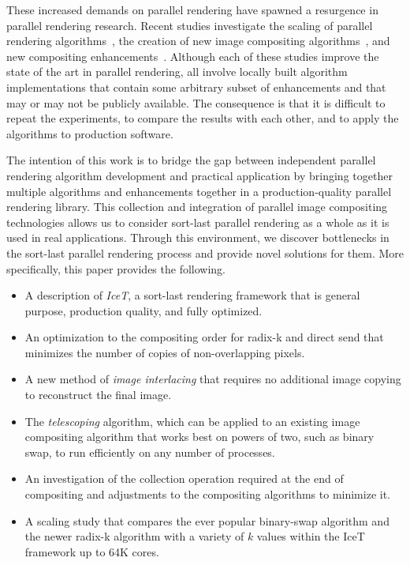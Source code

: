 \documentclass{acm_proc_article-sp}
\newcommand*{\lcite}[1]{~\cite{#1}}
\newcommand*{\keyterm}[1]{\emph{#1}}
\begin{document}
These increased demands on parallel rendering have spawned a resurgence in
parallel rendering research.  Recent studies investigate the scaling of
parallel rendering algorithms\lcite{Peterka2009}, the creation of new image
compositing algorithms\lcite{23Swap,RadixK}, and new compositing
enhancements\lcite{Kendall2010}.  Although each of these studies improve
the state of the art in parallel rendering, all involve locally built
algorithm implementations that contain some arbitrary subset of
enhancements and that may or may not be publicly available.  The
consequence is that it is difficult to repeat the experiments, to compare
the results with each other, and to apply the algorithms to production
software.

The intention of this work is to bridge the gap between independent
parallel rendering algorithm development and practical application by
bringing together multiple algorithms and enhancements together in a
production-quality parallel rendering library.  This collection and
integration of parallel image compositing technologies allows us to
consider sort-last parallel rendering as a whole as it is used in real
applications.  Through this environment, we discover bottlenecks in the
sort-last parallel rendering process and provide novel solutions for them.
More specifically, this paper provides the following.

\begin{itemize}
\item A description of \keyterm{IceT}, a sort-last rendering framework that
  is general purpose, production quality, and fully optimized.
\item An optimization to the compositing order for radix-k and
  direct send that minimizes the number of copies of non-overlapping
  pixels.
\item A new method of \keyterm{image interlacing} that requires no
  additional image copying to reconstruct the final image.
\item The \keyterm{telescoping} algorithm, which can be applied to an
  existing image compositing algorithm that works best on powers of two,
  such as binary swap, to run efficiently on any number of processes.
\item An investigation of the collection operation required at the end of
  compositing and adjustments to the compositing algorithms to minimize
  it.
\item A scaling study that compares the ever popular binary-swap algorithm
  and the newer radix-k algorithm with a variety of $k$ values within the
  IceT framework up to 64K cores.
\end{itemize}
\end{document}
